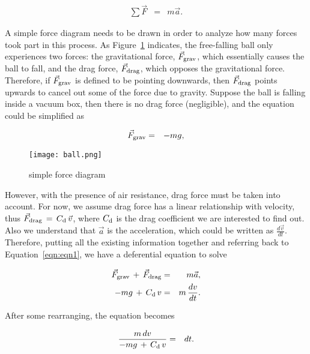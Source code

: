 \documentclass{article}
\begin{document}
\begin{eqnarray}
\sum\vec{F}&=&m\vec{a}. \label{eqn:eqn1}
\end{eqnarray}

\noindent A simple force diagram needs to be drawn in order to analyze how many forces took part in this process. As Figure~\ref{fig:forcediagram} indicates, the free-falling ball only experiences two forces: the gravitational force, $\vec{F}_{\textnormal{grav}}$, which essentially causes the ball to fall, and the drag force, $\vec{F}_{\textnormal{drag}}$, which opposes the gravitational force. Therefore, if $\vec{F}_{\textnormal{grav}}$ is defined to be pointing downwards, then $\vec{F}_{\textnormal{drag}}$ points upwards to cancel out some of the force due to gravity. Suppose the ball is falling inside a vacuum box, then there is no drag force (negligible), and the equation could be simplified as

\begin{eqnarray}
\vec{F}_{\textnormal{grav}}&=&-mg,
\end{eqnarray}

\begin{figure}[H]
\centering
\texttt{[image: ball.png]}
\caption{simple force diagram}
\label{fig:forcediagram}
\end{figure}

\noindent However, with the presence of air resistance, drag force must be taken into account. For now, we assume drag force has a linear relationship with velocity, thus $\vec{F}_{\textnormal{drag}}\,=\,C_{\textnormal{d}}\,\vec{v}$, where $C_{\textnormal{d}}$ is the drag coefficient we are interested to find out. Also we understand that $\vec{a}$ is the acceleration, which could be written as $\frac{d\vec{v}}{dt}$. Therefore, putting all the existing information together and referring back to Equation~\ref{eqn:eqn1}, we have a deferential equation to solve

\begin{eqnarray}
\vec{F}_{\textnormal{grav}}\,+\,\vec{F}_{\textnormal{drag}}&=&m\vec{a}, \\
-mg\,+\,C_{\textnormal{d}}\,v&=&m\,\frac{dv}{dt}. 
\end{eqnarray}

\noindent After some rearranging, the equation becomes

\begin{eqnarray}
\frac{m\,dv}{-mg\,+\,C_{\textnormal{d}}\,v}&=&dt.
\end{eqnarray}
\end{document}
